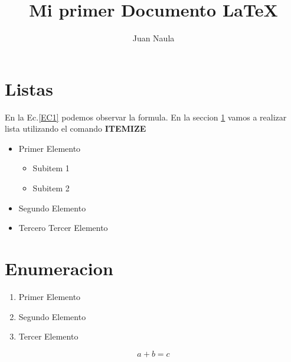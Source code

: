 \documentclass[a4paper, 11pt]{article}
\title{Mi primer Documento \LaTeX}
\author{Juan Naula}
\begin{document}
\maketitle
\section{Listas}\label{sec1}
En la Ec.\ref{EC1} podemos observar la formula.
En la seccion \ref{sec1} vamos a realizar lista utilizando el comando 
\textbf{ITEMIZE}

\begin{itemize}
    \item Primer Elemento
    \begin{itemize}
        \item Subitem 1
        \item Subitem 2
    \end{itemize}
      \item Segundo Elemento
        \item Tercero Tercer Elemento
\end{itemize}
\section{Enumeracion}
\begin{enumerate}
    \item Primer Elemento
    \item Segundo Elemento
    \item Tercer Elemento
\end{enumerate}

\begin{equation}
\label{EC1}
    a+b = c
\end{equation}
\end{document}
